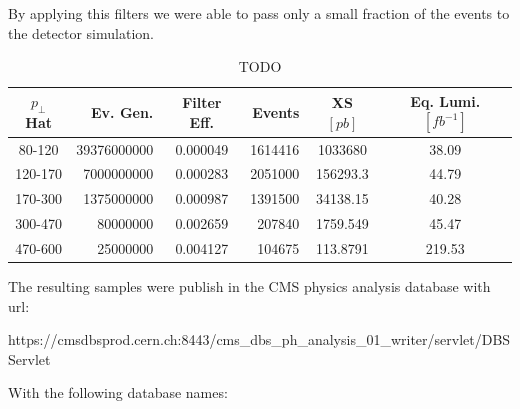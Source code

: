 \documentclass[a4paper]{article}
\begin{document}
By applying this filters we were able to pass only a small fraction of the events to the detector simulation.

\begin{table}
\centering

\begin{tabular}{|c|r|c|r|c|c|}
\hline
$p_\perp$ Hat & Ev. Gen. & Filter Eff. &  Events &  XS $[pb]$ & Eq. Lumi. $[fb^{-1}]$ \\
\hline \hline
80-120  & 39376000000 &    0.000049 & 1614416 &  1033680 &  38.09 \\
120-170 &  7000000000 &    0.000283 & 2051000 & 156293.3 &  44.79 \\
170-300 &  1375000000 &    0.000987 & 1391500 & 34138.15 &  40.28 \\
300-470 &    80000000 &    0.002659 &  207840 & 1759.549 &  45.47 \\
470-600 &    25000000 &    0.004127 &  104675 & 113.8791 & 219.53 \\
\hline
\end{tabular}

\caption{TODO}
\label{table_RunI_QCDFiltered_FilterEff}
\end{table}

The resulting samples were publish in the CMS physics analysis database with url:

\begin{center}
https://cmsdbsprod.cern.ch:8443/cms\_dbs\_ph\_analysis\_01\_writer/servlet/DBSServlet
\end{center}

With the following database names:
 
\begin{table}
\centering
 

\caption{TODO}
\label{table_RunI_QCDFiltered_SampleNames}
\end{table}
\end{document}
